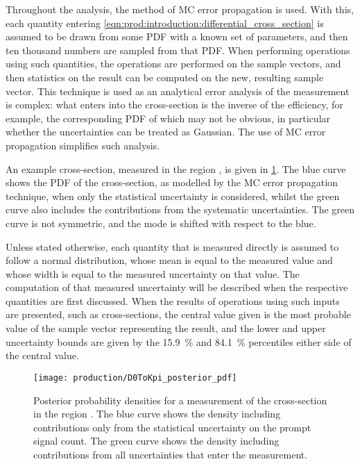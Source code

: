 Throughout the analysis, the method of \acl{MC} error propagation is used.
With this, each quantity entering 
\cref{eqn:prod:introduction:differential_cross_section} is assumed to be drawn 
from some \acf{PDF} with a known set of parameters, and then ten thousand 
numbers are sampled from that \ac{PDF}.
When performing operations using such quantities, the operations are performed 
on the sample vectors, and then statistics on the result can be computed on the 
new, resulting sample vector.
This technique is used as an analytical error analysis of the measurement is 
complex: what enters into the cross-section is the inverse of the efficiency, 
for example, the corresponding \acl{PDF} of which may not be obvious, in 
particular whether the uncertainties can be treated as Gaussian.
The use of \acl{MC} error propagation simplifies such analysis.

An example cross-section, measured in the region , is 
given in \cref{fig::prod:introduction:uncertainties:posterior}.
The blue curve shows the \ac{PDF} of the cross-section, as modelled by the 
\ac{MC} error propagation technique, when only the statistical uncertainty is 
considered, whilst the green curve also includes the contributions from the 
systematic uncertainties.
The green curve is not symmetric, and the mode is shifted with respect to the 
blue.

Unless stated otherwise, each quantity that is measured directly is assumed to 
follow a normal distribution, whose mean is equal to the measured value and 
whose width is equal to the measured uncertainty on that value.
The computation of that measured uncertainty will be described when the 
respective quantities are first discussed.
When the results of operations using such inputs are presented, such as 
cross-sections, the central value given is the most probable value of the 
sample vector representing the result, and the lower and upper uncertainty 
bounds are given by the \SI{15.9}{\percent} and \SI{84.1}{\percent} percentiles 
either side of the central value.

\begin{figure}
  \centering
  \texttt{[image: production/D0ToKpi\_posterior\_pdf]}
  \caption{%
    Posterior probability densities for a measurement of the \PDzero 
    cross-section in the region .
    The blue curve shows the density including contributions only from the 
    statistical uncertainty on the prompt signal count.
    The green curve shows the density including contributions from all 
    uncertainties that enter the measurement.
  }
  \label{fig::prod:introduction:uncertainties:posterior}
\end{figure}

